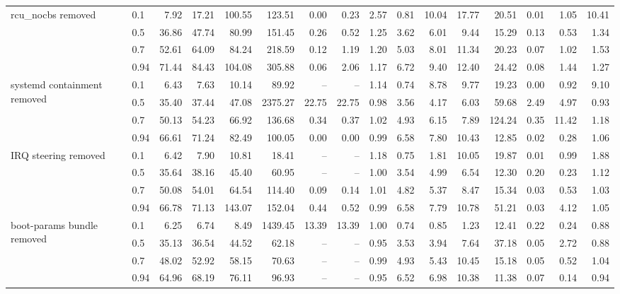 \begin{table}
{\begin{tabular}{llrrrrrrrrrrrrrr}
\multirow[t]{4}{*}{rcu\_nocbs removed} & 0.1 & 7.92 & 17.21 & 100.55 & 123.51 & 0.00 & 0.23 & 2.57 & 0.81 & 10.04 & 17.77 & 20.51 & 0.01 & 1.05 & 10.41 \\
 & 0.5 & 36.86 & 47.74 & 80.99 & 151.45 & 0.26 & 0.52 & 1.25 & 3.62 & 6.01 & 9.44 & 15.29 & 0.13 & 0.53 & 1.34 \\
 & 0.7 & 52.61 & 64.09 & 84.24 & 218.59 & 0.12 & 1.19 & 1.20 & 5.03 & 8.01 & 11.34 & 20.23 & 0.07 & 1.02 & 1.53 \\
 & 0.94 & 71.44 & 84.43 & 104.08 & 305.88 & 0.06 & 2.06 & 1.17 & 6.72 & 9.40 & 12.40 & 24.42 & 0.08 & 1.44 & 1.27 \\
\cmidrule{1-16}
\multirow[t]{4}{*}{systemd containment removed} & 0.1 & 6.43 & 7.63 & 10.14 & 89.92 & -- & -- & 1.14 & 0.74 & 8.78 & 9.77 & 19.23 & 0.00 & 0.92 & 9.10 \\
 & 0.5 & 35.40 & 37.44 & 47.08 & 2375.27 & 22.75 & 22.75 & 0.98 & 3.56 & 4.17 & 6.03 & 59.68 & 2.49 & 4.97 & 0.93 \\
 & 0.7 & 50.13 & 54.23 & 66.92 & 136.68 & 0.34 & 0.37 & 1.02 & 4.93 & 6.15 & 7.89 & 124.24 & 0.35 & 11.42 & 1.18 \\
 & 0.94 & 66.61 & 71.24 & 82.49 & 100.05 & 0.00 & 0.00 & 0.99 & 6.58 & 7.80 & 10.43 & 12.85 & 0.02 & 0.28 & 1.06 \\
\cmidrule{1-16}
\multirow[t]{4}{*}{IRQ steering removed} & 0.1 & 6.42 & 7.90 & 10.81 & 18.41 & -- & -- & 1.18 & 0.75 & 1.81 & 10.05 & 19.87 & 0.01 & 0.99 & 1.88 \\
 & 0.5 & 35.64 & 38.16 & 45.40 & 60.95 & -- & -- & 1.00 & 3.54 & 4.99 & 6.54 & 12.30 & 0.20 & 0.23 & 1.12 \\
 & 0.7 & 50.08 & 54.01 & 64.54 & 114.40 & 0.09 & 0.14 & 1.01 & 4.82 & 5.37 & 8.47 & 15.34 & 0.03 & 0.53 & 1.03 \\
 & 0.94 & 66.78 & 71.13 & 143.07 & 152.04 & 0.44 & 0.52 & 0.99 & 6.58 & 7.79 & 10.78 & 51.21 & 0.03 & 4.12 & 1.05 \\
\cmidrule{1-16}
\multirow[t]{4}{*}{boot-params bundle removed} & 0.1 & 6.25 & 6.74 & 8.49 & 1439.45 & 13.39 & 13.39 & 1.00 & 0.74 & 0.85 & 1.23 & 12.41 & 0.22 & 0.24 & 0.88 \\
 & 0.5 & 35.13 & 36.54 & 44.52 & 62.18 & -- & -- & 0.95 & 3.53 & 3.94 & 7.64 & 37.18 & 0.05 & 2.72 & 0.88 \\
 & 0.7 & 48.02 & 52.92 & 58.15 & 70.63 & -- & -- & 0.99 & 4.93 & 5.43 & 10.45 & 15.18 & 0.05 & 0.52 & 1.04 \\
 & 0.94 & 64.96 & 68.19 & 76.11 & 96.93 & -- & -- & 0.95 & 6.52 & 6.98 & 10.38 & 11.38 & 0.07 & 0.14 & 0.94 \\

\end{tabular}}
\end{table}
